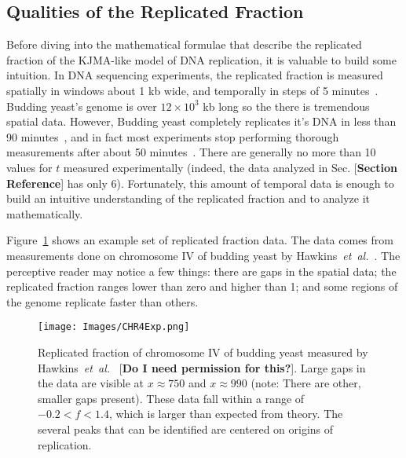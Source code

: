	
		\subsection{Qualities of the Replicated Fraction}
		\label{subsec:QualitiesReplicatedFraction}
		
		Before diving into the mathematical formulae that describe the replicated fraction of the KJMA-like model of DNA replication, it is valuable to build some intuition.
		In DNA sequencing experiments, the replicated fraction is measured spatially in windows about 1 kb wide, and temporally in steps of 5 minutes~\cite{StochasticTermination}.
		Budding yeast's genome is over $12\times10^3$ kb long so the there is tremendous spatial data.
		However, Budding yeast completely replicates it's DNA in less than 90 minutes~\cite{DeepSeq}, and in fact most experiments stop performing thorough measurements after about 50 minutes~\cite{StochasticTermination,DeepSeq,McCuneMicroArray}.
		There are generally no more than 10 values for $t$ measured experimentally (indeed, the data analyzed in Sec. [\textbf{Section Reference}] has only 6).
		Fortunately, this amount of temporal data is enough to build an intuitive understanding of the replicated fraction and to analyze it mathematically.
		
		Figure~\ref{fig:ReplicatedFractionExample} shows an example set of replicated fraction data.
		The data comes from measurements done on chromosome IV of budding yeast by Hawkins~\emph{et~al.}~\cite{StochasticTermination}.
		The perceptive reader may notice a few things:
		there are gaps in the spatial data;
		the replicated fraction ranges lower than zero and higher than 1;
		and some regions of the genome replicate faster than others.
		
		\begin{figure}[tbh]
			\begin{center}
				\texttt{[image: Images/CHR4Exp.png]}
			\end{center}
				\caption[Budding yeast chromosome IV replicated fraction]{\label{fig:ReplicatedFractionExample} Replicated fraction of chromosome IV of budding yeast measured by Hawkins~\emph{et~al.}~\cite{StochasticTermination} [\textbf{Do I need permission for this?}].	
					Large gaps in the data are visible at $x \approx 750$ and $x \approx 990$ (note: There are other, smaller gaps present).
					These data fall within a range of $-0.2 < f < 1.4$, which is larger than expected from theory.
					The several peaks that can be identified are centered on origins of replication.
				}
		\end{figure}
		
